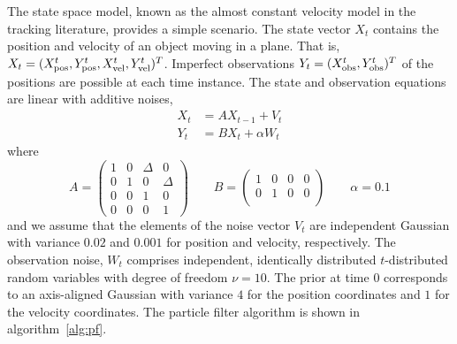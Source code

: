 The state space model, known as the almost constant velocity model in the
tracking literature, provides a simple scenario. The state vector $X_t$
contains the position and velocity of an object moving in a plane. That is,
$X_t = (X_{\mathrm{pos}}^t, Y_{\mathrm{pos}}^t, X_{\mathrm{vel}}^t, Y_{\mathrm{vel}}^t)^T$. Imperfect observations $Y_t =
(X_{\mathrm{obs}}^t, Y_{\mathrm{obs}}^t)^T$ of the positions are possible at each time instance. The
state and observation equations are linear with additive noises,
\begin{align*}
  X_t &= AX_{t-1} + V_t \\
  Y_t &= BX_t + \alpha W_t
\end{align*}
where
\begin{equation*}
  A = \begin{pmatrix}
    1 & 0 & \Delta & 0      \\
    0 & 1 & 0      & \Delta \\
    0 & 0 & 1      & 0      \\
    0 & 0 & 0      & 1
  \end{pmatrix} \qquad
  B = \begin{pmatrix}
    1 & 0 & 0 & 0 \\
    0 & 1 & 0 & 0 \\
  \end{pmatrix} \qquad
  \alpha = 0.1
\end{equation*}
and we assume that the elements of the noise vector $V_t$ are independent
Gaussian with variance $0.02$ and $0.001$ for position and velocity,
respectively. The observation noise, $W_t$ comprises independent, identically
distributed $t$-distributed random variables with degree of freedom $\nu = 10$.
The prior at time $0$ corresponds to an axis-aligned Gaussian with variance $4$
for the position coordinates and $1$ for the velocity coordinates. The particle
filter algorithm is shown in algorithm~\ref{alg:pf}.

